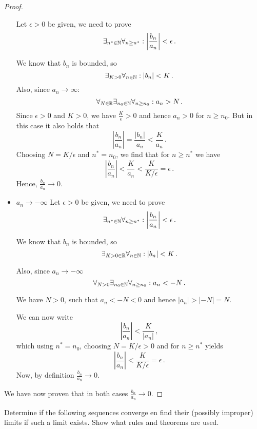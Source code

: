\documentclass[week=3]{homework}
\begin{document}
\begin{questions}
\begin{parts}
\begin{proof}
\begin{itemize}
		    		Let $\epsilon > 0$ be given, we need to prove
		    		\[
			    		\exists_{n^* \in \naturals} \forall_{n \ge n^*}: \left| \frac{b_n}{a_n}\right| < \epsilon\,.
		    		\]
		    		
		    		We know that $b_n$ is bounded, so
		    		\[
			    		\exists_{K > 0} \forall_{n \in \mathbb{N}}: |b_n| < K\,.
		    		\]
		    		Also, since $a_n \to \infty$:
		    		\[
			    		\forall_{N \in \mathbb{R}}\exists_{n_0 \in \mathbb{N}}\forall_{n \geq n_0}: a_n > N\,.
		    		\]
		    		Since $\epsilon > 0$ and $K > 0$, we have $\frac{K}{\epsilon} > 0$ and hence $a_n > 0$ for $n \geq n_0$. But in this case it also holds that
		    		\[
			    		\left|\frac{b_n}{a_n}\right| = \frac{|b_n|}{a_n} < \frac{K}{a_n}\,.
		    		\]
			    	Choosing $N = K/\epsilon$ and $n^* = n_0$, we find that for $n\geq n^*$ we have
		    		\[
			    		\left| \frac{b_n}{a_n} \right| < \frac{K}{a_n} < \frac{K}{K/\epsilon} = \epsilon\,.
		    		\]
		    		Hence, $\frac{b_n}{a_n} \to 0$.
		    		
	    			\item $a_n \to - \infty$
	    			Let $\epsilon > 0$ be given, we need to prove
	    			\[
		    			\exists_{n^* \in \naturals} \forall_{n \ge n^*}: \left| \frac{b_n}{a_n} \right| < \epsilon\,.
	    			\]
	    			
		    		We know that $b_n$ is bounded, so
		    		\[
			    		\exists_{K > 0 \in \mathbb{R}} \forall_{n \in \mathbb{N}}: |b_n| < K\,.
		    		\]
		    		
		    		Also, since $a_n \to -\infty$
		    		\[
			    		\forall_{N > 0} \exists_{n_0 \in \mathbb{N}} \forall_{n \ge n_0}: a_n < -N\,.
		    		\]
		    		
		    		We have $N > 0$, such that $a_n < -N < 0$ and hence $|a_n| > |-N| = N$.
		    		
		    		We can now write
		    		\[
			    		\left|\frac{b_n}{a_n}\right| < \frac{K}{|a_n|}\,,
		    		\]
		    		which using $n^* = n_0$, choosing $N = K/\epsilon > 0$ and for $n \geq n^*$ yields 
		    		\[
			    		\left|\frac{b_n}{a_n}\right| < \frac{K}{K/\epsilon} = \epsilon\,.
		    		\]
		    		Now, by definition $\frac{b_n}{a_n} \to 0$.
	    		\end{itemize}
	    		
	    		We have now proven that in both cases $\frac{b_n}{a_n} \to 0$.
	    	\end{proof}
	    \end{parts}
    
	    \question
	    Determine if the following sequences converge en find their (possibly improper) limits if such a limit exists. Show what rules and theorems are used.
	    

\end{questions}
\end{document}
